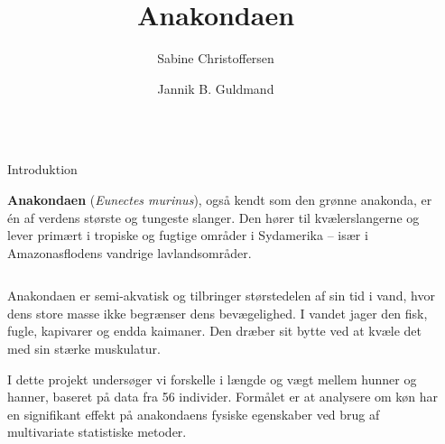 \documentclass[final]{beamer}
\title{Anakondaen}
\author{Sabine Christoffersen \inst{} \and Jannik B. Guldmand \inst{}}
\institute[shortinst]{\inst{} Data Science - DS805 Multivariat Statistik}
\newlength{\sepwidth}
\newlength{\colwidth}
\newcommand{\separatorcolumn}{\begin{column}{\sepwidth}\end{column}}
\begin{document}
{
}

\begin{frame}[t]
\begin{columns}[t]
\separatorcolumn

\begin{column}{\colwidth}

  \begin{block}{Introduktion}
  \justifying

	\textbf{Anakondaen} (\textit{Eunectes murinus}), også kendt som
	den grønne anakonda, er én af verdens største og
	tungeste slanger. Den hører til kvælerslangerne
	og lever primært i tropiske og fugtige områder i
	Sydamerika – især i Amazonasflodens vandrige
	lavlandsområder.
	\vspace{0.5em}
	
	
	\begin{columns}
	
  \begin{column}{0.40\textwidth}

  Anakondaen er semi-akvatisk og tilbringer
	størstedelen af sin tid i vand, hvor dens store
	masse ikke begrænser dens bevægelighed. I vandet
	jager den fisk, fugle, kapivarer og endda
	kaimaner. Den dræber sit bytte ved at kvæle det
	med sin stærke muskulatur.
	\vspace{1em}

	I dette projekt undersøger vi forskelle i længde
	og vægt mellem hunner og hanner, baseret på data
	fra 56 individer. Formålet er at analysere om
	køn har en signifikant effekt på anakondaens
	fysiske egenskaber ved brug af multivariate
	statistiske metoder.

  \end{column}
  

\end{columns}
\end{block}
\end{column}
\end{columns}
\end{frame}
\end{document}
